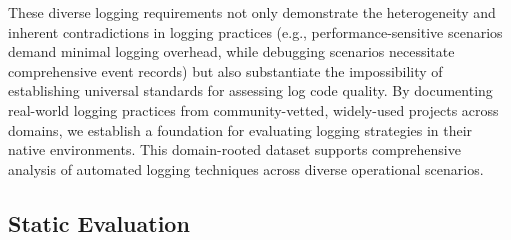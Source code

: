 These diverse logging requirements not only demonstrate the heterogeneity and inherent contradictions in logging practices (e.g., performance-sensitive scenarios demand minimal logging overhead, while debugging scenarios necessitate comprehensive event records) but also substantiate the impossibility of establishing universal standards for assessing log code quality.
By documenting real-world logging practices from community-vetted, widely-used projects across domains, we establish a foundation for evaluating logging strategies in their native environments. This domain-rooted dataset supports comprehensive analysis of automated logging techniques across diverse operational scenarios.
    

 


\subsection{Static Evaluation}
\label{sec:statci_evaluation}
